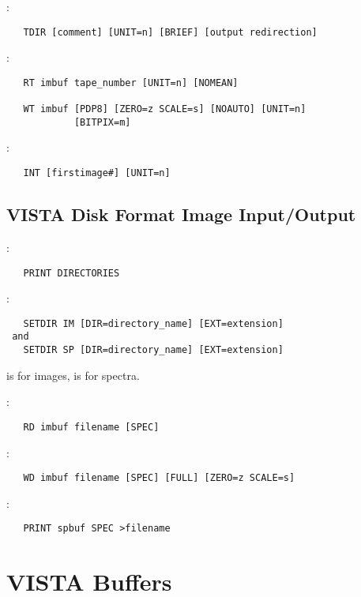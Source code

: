 \noindent {}:
\begin{verbatim}
   TDIR [comment] [UNIT=n] [BRIEF] [output redirection]
\end{verbatim}

\noindent {}:
\begin{verbatim}
   RT imbuf tape_number [UNIT=n] [NOMEAN]

   WT imbuf [PDP8] [ZERO=z SCALE=s] [NOAUTO] [UNIT=n]
            [BITPIX=m]
\end{verbatim}

\noindent {}:
\begin{verbatim}
   INT [firstimage#] [UNIT=n]
\end{verbatim}

\subsection{VISTA Disk Format Image Input/Output}

:
\begin{verbatim}
   PRINT DIRECTORIES
\end{verbatim}

:
\begin{verbatim}
   SETDIR IM [DIR=directory_name] [EXT=extension]
 and
   SETDIR SP [DIR=directory_name] [EXT=extension]
\end{verbatim}
 is for images,  is for spectra.

\noindent {}:
\begin{verbatim}
   RD imbuf filename [SPEC]
\end{verbatim}

\noindent {}:
\begin{verbatim}
   WD imbuf filename [SPEC] [FULL] [ZERO=z SCALE=s]
\end{verbatim}

\noindent {}:
\begin{verbatim}
   PRINT spbuf SPEC >filename
\end{verbatim}


\section{VISTA Buffers}

